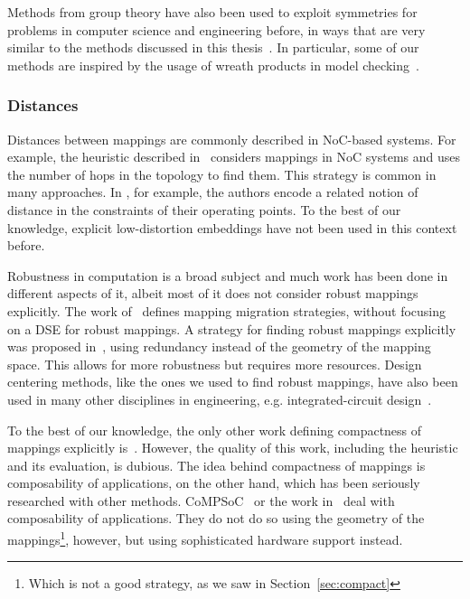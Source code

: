 Methods from group theory have also been used to exploit symmetries for problems in computer science and engineering before, in ways that are very similar to the methods discussed in this thesis~\cite{crawford1996symmetry,clarke1998symmetry}.
In particular, some of our methods are inspired by the usage of wreath products in model checking~\cite{donaldson2009constructive}.

\subsubsection{Distances}

Distances between mappings are commonly described in \ac{NoC}-based systems.
For example, the heuristic described in~\cite{singh2010communication} considers mappings in \ac{NoC} systems and uses the number of hops in the topology to find them.
This strategy is common in many approaches.
In \cite{weichslgartner2014daarm}, for example, the authors encode a related notion of distance in the constraints of their operating points.
To the best of our knowledge, explicit low-distortion embeddings have not been used in this context before.

Robustness in computation is a broad subject and much work has been done in different aspects of it, albeit most of it does not consider robust mappings explicitly. 
The work of~\cite{zhang2011dependability,zhao2019health} defines mapping migration strategies, without focusing on a \ac{DSE} for robust mappings.
A strategy for finding robust mappings explicitly was proposed in~\cite{chen2016task}, using redundancy instead of the geometry of the mapping space.
This allows for more robustness but requires more resources.  
Design centering methods, like the ones we used to find robust mappings, have also been used in many other disciplines in engineering, e.g. integrated-circuit design~\cite{chen2015analysis}.

To the best of our knowledge, the only other work defining compactness of mappings explicitly is~\cite{yang2010multi}.
However, the quality of this work, including the heuristic and its evaluation, is dubious. 
The idea behind compactness of mappings is composability of applications, on the other hand, which has been seriously researched with other methods.
CoMPSoC~\cite{hansson2009compsoc} or the work in~\cite{kumar2008analyzing} deal with composability of applications.
They do not do so using the geometry of the mappings\footnote{Which is not a good strategy, as we saw in Section~\ref{sec:compact}}, however, but using sophisticated hardware support instead.

